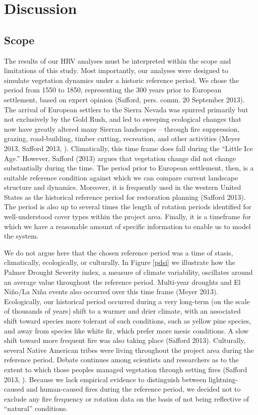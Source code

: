 \chapter{Discussion}
\section{Scope}
The results of our HRV analyses must be interpreted within the scope and limitations of this study. Most importantly, our analyses were designed to simulate vegetation dynamics under a historic reference period. We chose the period from 1550 to 1850, representing the 300 years prior to European settlement, based on expert opinion (Safford, pers. comm. 20 September 2013). The arrival of European settlers to the Sierra Nevada was spurred primarily but not exclusively by the Gold Rush, and led to sweeping ecological changes that now have greatly altered many Sierran landscapes -- through fire suppression, grazing, road-building, timber cutting, recreation, and other activities (Meyer 2013, Safford 2013, ). Climatically, this time frame does fall during the ``Little Ice Age.'' However, Safford (2013) argues that vegetation change did not change substantially during the time. The period prior to European settlement, then, is a suitable reference condition against which we can compare current landscape structure and dynamics. Moreover, it is frequently used in the western United States as the historical reference period for restoration planning (Safford 2013). The period is also up to several times the length of rotation periods identified for well-understood cover types within the project area. Finally, it is a timeframe for which we have a reasonable amount of specific information to enable us to model the system.

We do not argue here that the chosen reference period was a time of stasis, climatically, ecologically, or culturally. In Figure \ref{pdsi} we illustrate how the Palmer Drought Severity index, a measure of climate variability, oscillates around an average value throughout the reference period. Multi-year droughts and El Niño/La Niña events also occurred over this time frame (Meyer 2013). Ecologically, our historical period occurred during a very long-term (on the scale of thousands of years) shift to a warmer and drier climate, with an associated shift toward species more tolerant of such conditions, such as yellow pine species, and away from species like white fir, which prefer more mesic conditions. A slow shift toward more frequent fire was also taking place (Safford 2013). Culturally, several Native American tribes were living throughout the project area during the reference period. Debate continues among scientists and researchers as to the extent to which those peoples managed vegetation through setting fires (Safford 2013, ). Because we lack empirical evidence to distinguish between lightning-caused and human-caused fires during the reference period, we decided not to exclude any fire frequency or rotation data on the basis of not being reflective of ``natural'' conditions.

